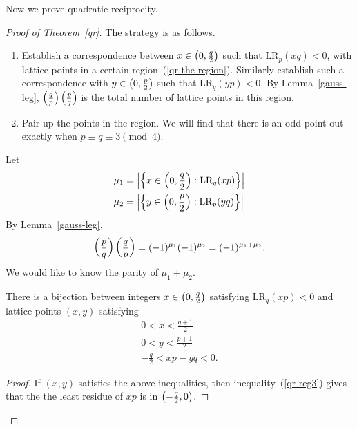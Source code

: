 Now we prove quadratic reciprocity.
\begin{proof}[Proof of Theorem~\ref{qr}]
The strategy is as follows.
\begin{enumerate}
\item 
Establish a correspondence between $x\in \left( {0,\frac q2} \right)$ such that $\text{LR}_p(xq)<0$, with lattice points in a certain region~(\ref{qr-the-region}). Similarly establish such a correspondence with $y\in \left( {0,\frac p2} \right)$ such that $\text{LR}_q(yp)<0$. By Lemma~\ref{gauss-leg}, $\left( {\frac{q}{p}} \right) \left( {\frac{p}{q}} \right)$ is the total number of lattice points in this region.
\item
Pair up the points in the region. We will find that there is an odd point out exactly when $p\equiv q\equiv 3\pmod 4$.
\end{enumerate}
Let
\begin{align*}
\mu_1&=\left| {\left\{{x\in\left( {0,\frac q2} \right)}:{\text{LR}_q(xp)}\right\}} \right|\\
\mu_2&=\left| {\left\{{y\in\left( {0,\frac p2} \right)}:{\text{LR}_p(yq)}\right\}} \right|
\end{align*}
By Lemma~\ref{gauss-leg},
\begin{equation}\label{qr-mu}
\left( {\frac{p}{q}} \right)\left( {\frac{q}{p}} \right)=(-1)^{\mu_1}(-1)^{\mu_2} =(-1)^{\mu_1+\mu_2}.
\end{equation}
We would like to know the parity of $\mu_1+\mu_2$.

\begin{clm}\label{qr-reg}
There is a bijection between integers $x\in \left( {0,\frac q2} \right)$ satisfying $\text{LR}_q(xp)<0$ and lattice points $(x,y)$ satisfying
\begin{gather}
0<x<\frac{q+1}{2}\label{qr-reg1}\\
0<y<\frac{p+1}{2}\label{qr-reg2}\\
-\frac{q}{2}<xp-yq<0.\label{qr-reg3}
\end{gather}
\end{clm}
\begin{proof}
If $(x,y)$ satisfies the above inequalities, then inequality~(\ref{qr-reg3}) gives that the the least residue of $xp$ is in $\left( {-\frac q2,0} \right)$.


\end{proof}
\end{proof}
